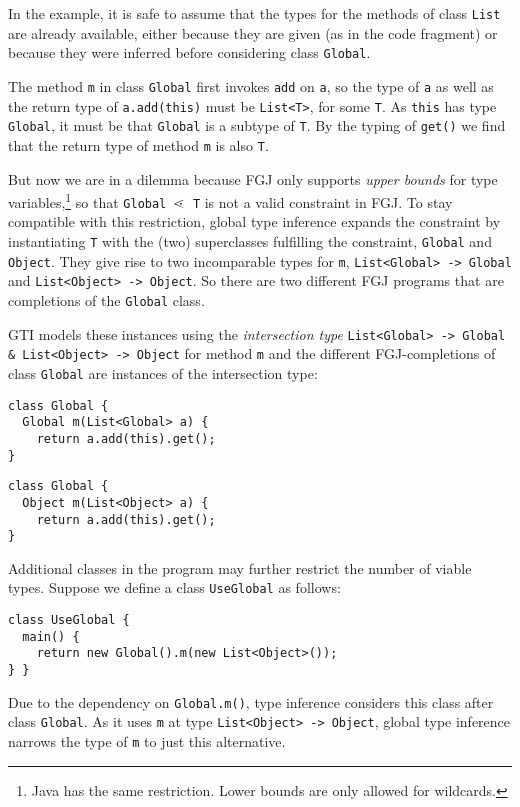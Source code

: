 In the example, it is safe to assume that the types for the methods of class \texttt{List}
are already available, either because they are given (as in the code
fragment) or because they were inferred before considering class \texttt{Global}.

The method \texttt{m} in class \texttt{Global} first invokes
\texttt{add} on \texttt{a}, so the type of \texttt{a} as well as the
return type of \texttt{a.add(this)} must be
\texttt{List<T>}, for some \texttt{T}. As \texttt{this} has
type \texttt{Global}, it must be that \texttt{Global} is a
subtype of \texttt{T}. By the typing of \texttt{get()} we find that
the return type of method \texttt{m} is also \texttt{T}.

But now we are in a dilemma because FGJ only supports \emph{upper bounds} for
type variables,\footnote{Java has the same restriction. Lower bounds
  are only allowed for wildcards.} so that 
\texttt{Global $\lessdot$ T} is not a valid constraint in FGJ.
To stay compatible with this restriction, global type inference
expands the constraint by instantiating \texttt{T} with the (two) superclasses fulfilling
the constraint, \texttt{Global} and \texttt{Object}.  They give rise to two incomparable
types for 
\texttt{m}, \texttt{List<Global> -> Global} and
\texttt{List<Object> -> Object}. So there are two different FGJ
programs that are completions of the \texttt{Global} class.

GTI models these instances using the \emph{intersection type}
\texttt{List<Global> -> Global \& List<Object> -> Object}
for method \texttt{m} and the different FGJ-completions of class \texttt{Global} are
instances of the intersection type:
\begin{center}
  \begin{minipage}{0.49\linewidth}
\begin{lstlisting}
class Global {
  Global m(List<Global> a) {
    return a.add(this).get();
}
\end{lstlisting}
  \end{minipage}
  \begin{minipage}{0.49\linewidth}
\begin{lstlisting}
class Global {
  Object m(List<Object> a) {
    return a.add(this).get();
}
\end{lstlisting}
  \end{minipage}
\end{center}
Additional classes in the program may further restrict the number of
viable types. Suppose we define a class \texttt{UseGlobal} as
follows:
\begin{lstlisting}
class UseGlobal {
  main() {
    return new Global().m(new List<Object>());
} }
\end{lstlisting}
Due to the dependency on \texttt{Global.m()}, type inference considers this class after class
\texttt{Global}. As it uses \texttt{m} at type
\texttt{List<Object> -> Object}, global type inference narrows the
type of \texttt{m} to just this alternative.


